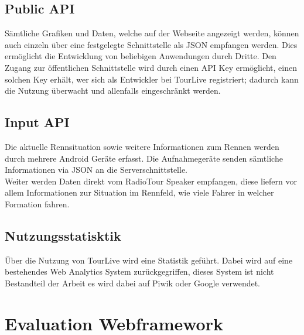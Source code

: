 \subsection{Public API}
Sämtliche Grafiken und Daten, welche auf der Webseite angezeigt werden, können auch einzeln über eine festgelegte Schnittstelle als JSON empfangen werden. Dies ermöglicht die Entwicklung von beliebigen Anwendungen durch Dritte. Den Zugang zur öffentlichen Schnittstelle wird durch einen API Key ermöglicht, einen solchen Key erhält, wer sich als Entwickler bei TourLive registriert; dadurch kann die Nutzung überwacht und allenfalls eingeschränkt werden.
\subsection{Input API}
Die aktuelle Rennsituation sowie weitere Informationen zum Rennen werden durch mehrere Android Geräte erfasst. Die Aufnahmegeräte senden sämtliche Informationen via JSON an die Serverschnittstelle. 
\\
Weiter werden Daten direkt vom RadioTour Speaker empfangen, diese liefern vor allem Informationen zur Situation im Rennfeld, wie viele Fahrer in welcher Formation fahren.
\subsection{Nutzungsstatisktik}
Über die Nutzung von TourLive wird eine Statistik geführt. Dabei wird auf eine bestehendes Web Analytics System zurückgegriffen, dieses System ist nicht Bestandteil der Arbeit es wird dabei auf Piwik oder Google verwendet.

\section{Evaluation Webframework}
\label{sec:evaluationwebframework}
